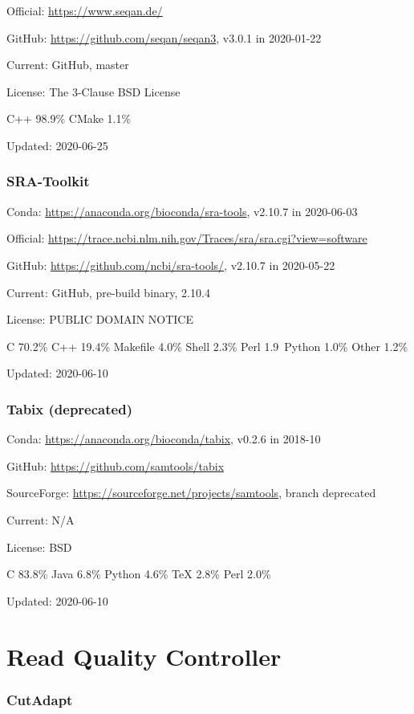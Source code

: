 \documentclass[]{article}
\begin{document}
Official: \url{https://www.seqan.de/}

GitHub: \url{https://github.com/seqan/seqan3}, v3.0.1 in 2020-01-22

Current: GitHub, master

License: The 3-Clause BSD License

C++ 98.9\% CMake 1.1\%

Updated: 2020-06-25

\section{SRA-Toolkit}

Conda: \url{https://anaconda.org/bioconda/sra-tools}, v2.10.7 in 2020-06-03

Official: \url{https://trace.ncbi.nlm.nih.gov/Traces/sra/sra.cgi?view=software}

GitHub: \url{https://github.com/ncbi/sra-tools/}, v2.10.7 in 2020-05-22

Current: GitHub, pre-build binary, 2.10.4

License: PUBLIC DOMAIN NOTICE

C 70.2\% C++ 19.4\% Makefile 4.0\% Shell 2.3\% Perl 1.9\ Python 1.0\% Other 1.2\%

Updated: 2020-06-10

\section{Tabix (deprecated)}

Conda: \url{https://anaconda.org/bioconda/tabix}, v0.2.6 in 2018-10

GitHub: \url{https://github.com/samtools/tabix}

SourceForge: \url{https://sourceforge.net/projects/samtools}, branch deprecated

Current: N/A

License: BSD

C 83.8\% Java 6.8\% Python 4.6\% TeX 2.8\% Perl 2.0\%

Updated: 2020-06-10

\part{Read Quality Controller}

\section{CutAdapt}
\end{document}
